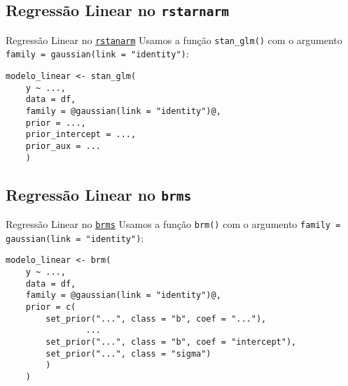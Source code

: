 \subsection{Regressão Linear no \texttt{rstarnarm}}
\begin{frame}[fragile]{Regressão Linear no \href{http://mc-stan.org/rstanarm/}{\texttt{rstanarm}}}
	Usamos a função \texttt{stan\_glm()} com o argumento \texttt{family = gaussian(link = "identity")}:
	\vfill
	\begin{lstlisting}[basicstyle=\small]
    modelo_linear <- stan_glm(
    y ~ ...,
    data = df,
    family = @gaussian(link = "identity")@,
    prior = ...,
    prior_intercept = ...,
    prior_aux = ...
    )
    \end{lstlisting}
\end{frame}

\subsection{Regressão Linear no \texttt{brms}}
\begin{frame}[fragile]{Regressão Linear no \href{https://paul-buerkner.github.io/brms/}{\texttt{brms}}}
	Usamos a função \texttt{brm()} com o argumento \texttt{family = gaussian(link = "identity")}:
	\vfill
	\begin{lstlisting}[basicstyle=\small]
    modelo_linear <- brm(
    y ~ ...,
    data = df,
    family = @gaussian(link = "identity")@,
    prior = c(
        set_prior("...", class = "b", coef = "..."),
                ...
        set_prior("...", class = "b", coef = "intercept"),
        set_prior("...", class = "sigma")
        )
    )
    \end{lstlisting}
\end{frame}
